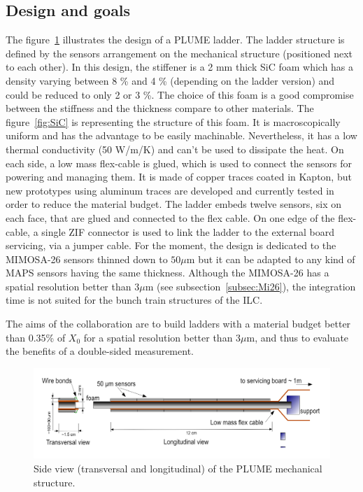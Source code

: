     \subsection{Design and goals}

    The figure~\ref{fig:PLUME} illustrates the design of a PLUME ladder.
    The ladder structure is defined by the sensors arrangement on the mechanical structure (positioned next to each other).
    In this design, the stiffener is a 2 mm thick \gls{SiC} foam which has a density varying between 8 \% and 4 \% (depending on the ladder version) and could be reduced to only 2 or 3 \%.
    The choice of this foam is a good compromise between the stiffness and the thickness compare to other materials. 
    The figure~\ref{fig:SiC} is representing the structure of this foam.
    It is macroscopically uniform and has the advantage to be easily machinable.
    Nevertheless, it has a low thermal conductivity (50 W/m/K) and can't be used to dissipate the heat.
    On each side, a low mass flex-cable is glued, which is used to connect the sensors for powering and managing them.
    It is made of copper traces coated in Kapton, but new prototypes using aluminum traces are developed and currently tested in order to reduce the material budget.
    The ladder embeds twelve sensors, six on each face, that are glued and connected to the flex cable.
    On one edge of the flex-cable, a single \gls{ZIF} connector is used to link the ladder to the external board servicing, via a jumper cable.
    For the moment, the design is dedicated to the MIMOSA-26 sensors thinned down to $50 \mu\text{m}$ but it can be adapted to any kind of \gls{MAPS} sensors having the same thickness. 
    Although the MIMOSA-26 has a spatial resolution better than 3$\mu$m (see subsection~\ref{subsec:Mi26}), the integration time is not suited for the bunch train structures of the \gls{ILC}.

    The aims of the collaboration are to build ladders with a material budget better than 0.35\% of $X_0$ for a spatial resolution better than 3$\mu$m, and thus to evaluate the benefits of a double-sided measurement.

    \begin{figure}[!h]
      \centering
      \includegraphics[width = 15 cm]{Pictures/vxd/plume_finalGoal.png}
      \caption{Side view (transversal and longitudinal) of the PLUME mechanical structure.}
      \label{fig:PLUME}
    \end{figure}

